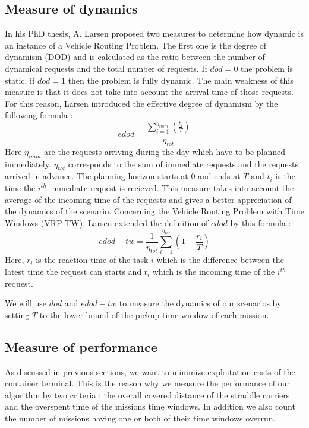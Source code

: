 \documentclass[a4paper,10pt]{article}
\begin{document}
	\subsection{Measure of dynamics}
In his PhD thesis\cite{Larsen00}, A. Larsen proposed two measures to determine how dynamic is an instance of a Vehicle Routing Problem. The first one is the degree of dynamism (DOD) and is calculated as the ratio between the number of dynamical requests and the total number of requests. If $dod=0$ the problem is static, if $dod=1$ then the problem is fully dynamic. The main weakness of this measure is that it does not take into account the arrival time of those requests. For this reason, Larsen introduced the effective degree of dynamism by the following formula : 
\begin{equation*}
 edod = \frac{\sum_{i=1}^{\eta_{imm}}\left(\frac{t_i}{T}\right)}{\eta_{tot}}
\end{equation*}
Here $\eta_{imm}$ are the requests arriving during the day which have to be planned immediately. $\eta_{tot}$ corresponds to the sum of immediate requests and the requests arrived in advance. The planning horizon starts at $0$ and ends at $T$ and $t_i$ is the time the $i^{th}$ immediate request is recieved. This measure takes into account the average of the incoming time of the requests and gives a better appreciation of the dynamics of the scenario.
Concerning the Vehicle Routing Problem with Time Windows (VRP-TW), Larsen extended the definition of $edod$ by this formula : 
\begin{equation*}
 edod-tw = \frac{1}{\eta_{tot}} \sum_{i=1}^{\eta_{tot}} \left(1 - \frac{r_i}{T}\right)
\end{equation*}
Here, $r_i$ is the reaction time of the task $i$ which is the difference between the latest time the request can starts and $t_i$ which is the incoming time of the $i^{th}$ request.

We will use $dod$ and $edod-tw$ to measure the dynamics of our scenarios by setting $T$ to the lower bound of the pickup time window of each mission.

	\subsection{Measure of performance}
As discussed in previous sections, we want to minimize exploitation costs of the container terminal. This is the reason why we measure the performance of our algorithm by two criteria : the overall covered distance of the straddle carriers and the overspent time of the missions time windows. In addition we also count the number of missions having one or both of their time windows overrun.
\end{document}
